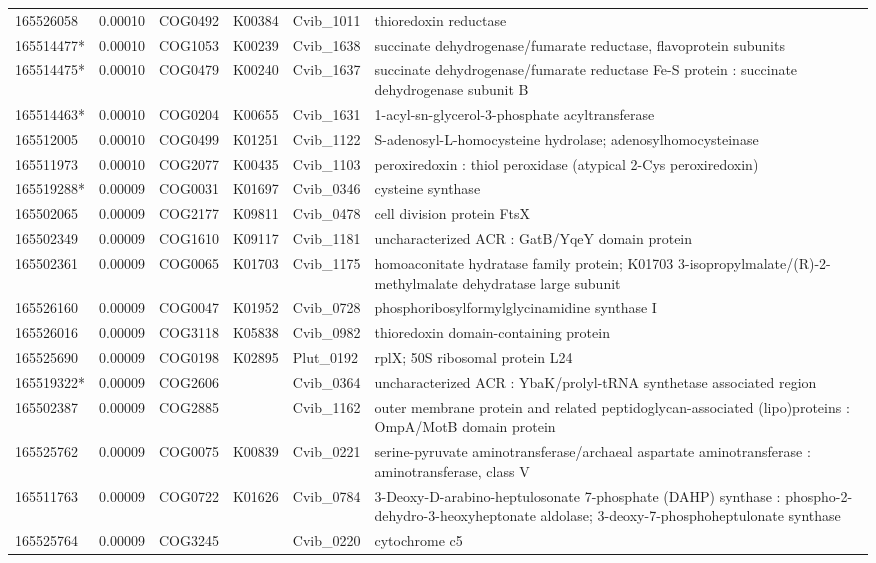 \begin{landscape}
\begin{longtable}{p{1.6cm}p{1.2cm}p{1.5cm}p{1.5cm}p{2.8cm}p{13.5cm}}
165526058&0.00010&COG0492&K00384&Cvib\_1011&thioredoxin reductase \\
165514477*&0.00010&COG1053&K00239&Cvib\_1638&succinate dehydrogenase/fumarate reductase, flavoprotein subunits \\
165514475*&0.00010&COG0479&K00240&Cvib\_1637&succinate dehydrogenase/fumarate reductase Fe-S protein : succinate dehydrogenase subunit B \\
165514463*&0.00010&COG0204&K00655&Cvib\_1631&1-acyl-sn-glycerol-3-phosphate acyltransferase \\
165512005&0.00010&COG0499&K01251&Cvib\_1122&S-adenosyl-L-homocysteine hydrolase; adenosylhomocysteinase \\
165511973&0.00010&COG2077&K00435&Cvib\_1103&peroxiredoxin : thiol peroxidase (atypical 2-Cys peroxiredoxin) \\
165519288*&0.00009&COG0031&K01697&Cvib\_0346&cysteine synthase \\
165502065&0.00009&COG2177&K09811&Cvib\_0478&cell division protein FtsX \\
165502349&0.00009&COG1610&K09117&Cvib\_1181&uncharacterized ACR : GatB/YqeY domain protein \\
165502361&0.00009&COG0065&K01703&Cvib\_1175&homoaconitate hydratase family protein; K01703 3-isopropylmalate/(R)-2-methylmalate dehydratase large subunit \\
165526160&0.00009&COG0047&K01952&Cvib\_0728&phosphoribosylformylglycinamidine synthase I \\
165526016&0.00009&COG3118&K05838&Cvib\_0982&thioredoxin domain-containing protein \\
165525690&0.00009&COG0198&K02895&Plut\_0192&rplX; 50S ribosomal protein L24 \\
165519322*&0.00009&COG2606&&Cvib\_0364&uncharacterized ACR : YbaK/prolyl-tRNA synthetase associated region \\
165502387&0.00009&COG2885&&Cvib\_1162&outer membrane protein and related peptidoglycan-associated (lipo)proteins : OmpA/MotB domain protein \\
165525762&0.00009&COG0075&K00839&Cvib\_0221&serine-pyruvate aminotransferase/archaeal aspartate aminotransferase : aminotransferase, class V \\
165511763&0.00009&COG0722&K01626&Cvib\_0784&3-Deoxy-D-arabino-heptulosonate 7-phosphate (DAHP) synthase : phospho-2-dehydro-3-heoxyheptonate aldolase; 3-deoxy-7-phosphoheptulonate synthase \\
165525764&0.00009&COG3245&&Cvib\_0220&cytochrome c5 \\

\end{longtable}
\end{landscape}
